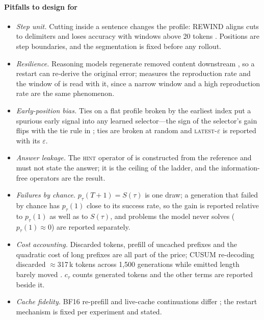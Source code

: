 \documentclass[10pt,a4paper]{article}
\begin{document}
\paragraph{Pitfalls to design for}
\begin{itemize}[leftmargin=1.1em]
\item \emph{Step unit.} Cutting inside a sentence changes the profile: REWIND aligns cuts to delimiters and loses accuracy with windows above 20 tokens \cite{ding2026rewind}. Positions are step boundaries, and the segmentation is fixed before any rollout.
\item \emph{Resilience.} Reasoning models regenerate removed content downstream \cite{macar2025thoughtbranches}, so a restart can re-derive the original error;  measures the reproduction rate and the window of  is read with it, since a narrow window and a high reproduction rate are the same phenomenon.
\item \emph{Early-position bias.} Ties on a flat profile broken by the earliest index put a spurious early signal into any learned selector---the sign of the selector's gain flips with the tie rule in \citet{atri2026expanding}; ties are broken at random and \textsc{latest-}$\varepsilon$ is reported with its $\varepsilon$.
\item \emph{Answer leakage.} The \textsc{hint} operator of  is constructed from the reference and must not state the answer; it is the ceiling of the ladder, and the information-free operators are the result.
\item \emph{Failures by chance.} $p_\tau(T{+}1)=S(\tau)$ is one draw; a generation that failed by chance has $p_\tau(1)$ close to its success rate, so the gain is reported relative to $p_\tau(1)$ as well as to $S(\tau)$, and problems the model never solves ($p_\tau(1)\approx0$) are reported separately.
\item \emph{Cost accounting.} Discarded tokens, prefill of uncached prefixes and the quadratic cost of long prefixes are all part of the price; CUSUM re-decoding discarded $\approx$317\,k tokens across 1,500 generations while emitted length barely moved \cite{ettifouri2026cusum}. $c_\tau$ counts generated tokens and the other terms are reported beside it.
\item \emph{Cache fidelity.} BF16 re-prefill and live-cache continuations differ \cite{lorup2026stagereplay}; the restart mechanism is fixed per experiment and stated.
\end{itemize}
\end{document}

